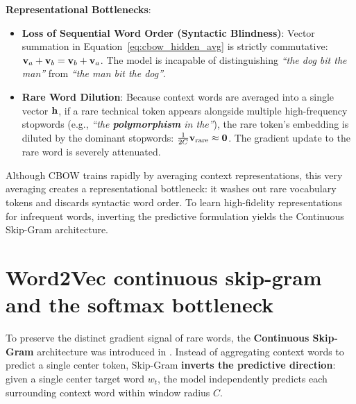 \documentclass[../../main.tex]{subfiles}
\begin{document}
\noindent\textbf{Representational Bottlenecks}:
\begin{itemize}
    \item \textbf{Loss of Sequential Word Order (Syntactic Blindness)}: Vector summation in Equation~\eqref{eq:cbow_hidden_avg} is strictly commutative: $\mathbf{v}_a + \mathbf{v}_b = \mathbf{v}_b + \mathbf{v}_a$. The model is incapable of distinguishing \emph{``the dog bit the man''} from \emph{``the man bit the dog''}.
    \item \textbf{Rare Word Dilution}: Because context words are averaged into a single vector $\mathbf{h}$, if a rare technical token appears alongside multiple high-frequency stopwords (e.g., \emph{``the \textbf{polymorphism} in the''}), the rare token's embedding is diluted by the dominant stopwords: $\frac{1}{2C} \mathbf{v}_{\text{rare}} \approx \mathbf{0}$. The gradient update to the rare word is severely attenuated.
\end{itemize}

Although CBOW trains rapidly by averaging context representations, this very averaging creates a representational bottleneck: it washes out rare vocabulary tokens and discards syntactic word order. To learn high-fidelity representations for infrequent words, inverting the predictive formulation yields the Continuous Skip-Gram architecture.

\clearpage
\section{Word2Vec continuous skip-gram and the softmax bottleneck}
\label{sec:skipgram_architecture}

To preserve the distinct gradient signal of rare words, the \textbf{Continuous Skip-Gram} architecture was introduced in \cite{mikolov2013efficient}. Instead of aggregating context words to predict a single center token, Skip-Gram \textbf{inverts the predictive direction}: given a single center target word $w_t$, the model independently predicts each surrounding context word within window radius $C$.
\end{document}
